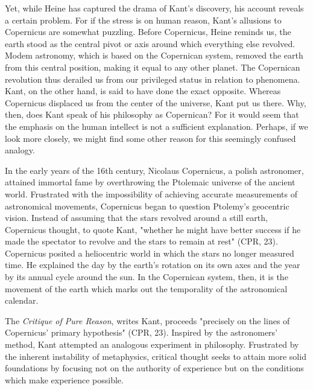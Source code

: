 Yet, while Heine has captured the drama of Kant's discovery, his account reveals a certain problem. For if the stress is on human reason, Kant's allusions to Copernicus are somewhat puzzling. Before Copernicus, Heine reminds us, the earth stood as the central pivot or axis around which everything else revolved. Modem astronomy, which is based on the Copernican system, removed the earth from this central position, making it equal to any other planet. The Copernican revolution thus derailed us from our privileged status in relation to phenomena. Kant, on the other hand, is said to have done the exact opposite. Whereas Copernicus displaced us from the center of the universe, Kant put us there. Why, then, does Kant speak of his philosophy as Copernican? For it would seem that the emphasis on the human intellect is not a sufficient explanation. Perhaps, if we look more closely, we might find some other reason for this seemingly confused analogy. 

In the early years of the 16th century, Nicolaus Copernicus, a polish astronomer, attained immortal fame by overthrowing the Ptolemaic universe of the ancient world. Frustrated with the impossibility of achieving accurate measurements of astronomical movements, Copernicus began to question Ptolemy's geocentric vision. Instead of assuming that the stars revolved around a still earth, Copernicus thought, to quote Kant, "whether he might have better success if he made the spectator to revolve and the stars to remain at rest" (CPR, 23). Copernicus posited a heliocentric world in which the stars no longer measured time. He explained the day by the earth's rotation on its own axes and the year by its annual cycle around the sun. In the Copernican system, then, it is the movement of the earth which marks out the temporality of the astronomical calendar. 

The \textit{Critique of Pure Reason}, writes Kant, proceeds "precisely on the lines of Copernicus' primary hypothesis" (CPR, 23). Inspired by the astronomers' method, Kant attempted an analogous experiment in philosophy. Frustrated by the inherent instability of metaphysics, critical thought seeks to attain more solid foundations by focusing not on the authority of experience but on the conditions which make experience possible. 

